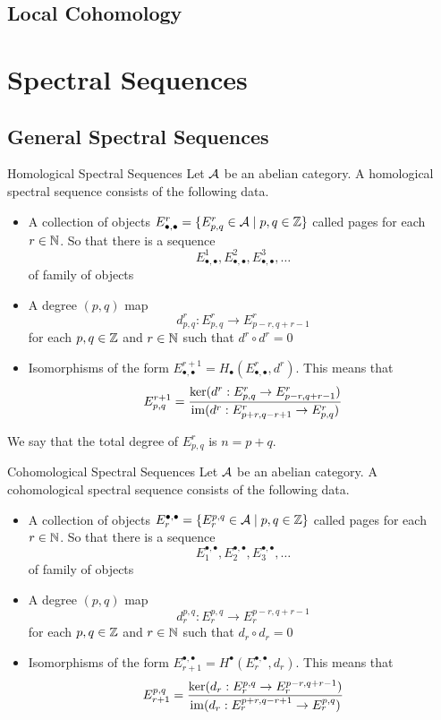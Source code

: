 \documentclass[a4paper]{article}
\begin{document}
\subsection{Local Cohomology}

\pagebreak
\section{Spectral Sequences}
\subsection{General Spectral Sequences}
\begin{defn}{Homological Spectral Sequences}{} Let $\mathcal{A}$ be an abelian category. A homological spectral sequence consists of the following data.  
\begin{itemize}
\item A collection of objects $E_{\bullet,\bullet}^r=\{E_{p,q}^r\in\mathcal{A}\;|\;p,q\in\mathbb{Z}\}$ called pages for each $r\in\mathbb{N}$. So that there is a sequence $$E_{\bullet,\bullet}^1,E_{\bullet,\bullet}^2,E_{\bullet,\bullet}^3,\dots$$ of family of objects
\item A degree $(p,q)$ map $$d_{p,q}^r:E_{p,q}^r\to E_{p-r,q+r-1}^r$$ for each $p,q\in\mathbb{Z}$ and $r\in\mathbb{N}$ such that $d^r\circ d^r=0$
\item Isomorphisms of the form $E_{\bullet,\bullet}^{r+1}=H_\bullet(E_{\bullet,\bullet}^r,d^r)$. This means that $$E_{p,q}^{r+1}=\frac{\ker(d^r:E_{p,q}^r\to E_{p-r,q+r-1}^r)}{\operatorname{im}(d^r:E_{p+r,q-r+1}^r\to E_{p,q}^r)}$$
\end{itemize}
We say that the total degree of $E_{p,q}^r$ is $n=p+q$. 
\end{defn}

\begin{defn}{Cohomological Spectral Sequences}{} Let $\mathcal{A}$ be an abelian category. A cohomological spectral sequence consists of the following data.  
\begin{itemize}
\item A collection of objects $E_r^{\bullet,\bullet}=\{E_r^{p,q}\in\mathcal{A}\;|\;p,q\in\mathbb{Z}\}$ called pages for each $r\in\mathbb{N}$. So that there is a sequence $$E_1^{\bullet,\bullet},E_2^{\bullet,\bullet},E_3^{\bullet,\bullet},\dots$$ of family of objects
\item A degree $(p,q)$ map $$d_r^{p,q}:E_r^{p,q}\to E_r^{p-r,q+r-1}$$ for each $p,q\in\mathbb{Z}$ and $r\in\mathbb{N}$ such that $d_r\circ d_r=0$
\item Isomorphisms of the form $E_{r+1}^{\bullet,\bullet}=H^\bullet(E_r^{\bullet,\bullet},d_r)$. This means that $$E_{r+1}^{p,q}=\frac{\ker(d_r:E_r^{p,q}\to E_r^{p-r,q+r-1})}{\operatorname{im}(d_r:E_r^{p+r,q-r+1}\to E_r^{p,q})}$$
\end{itemize}
\end{defn}
\end{document}
